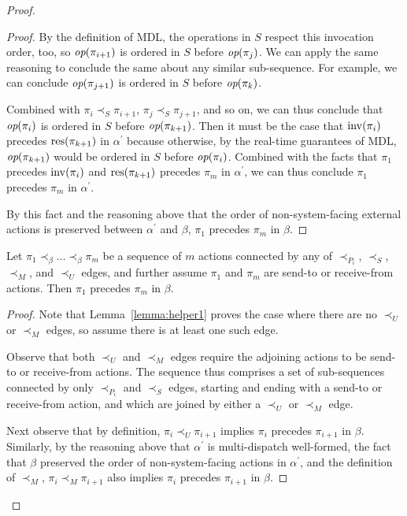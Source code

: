 \begin{proof}
\begin{proof}
      By the definition of MDL, the operations in $S$ respect this invocation order, too, so $\operatorname*{\textit{op}}(\pi_{i+1})$ is ordered in $S$ before $\operatorname*{\textit{op}}(\pi_j)$. We can apply the same reasoning to conclude the same about any similar sub-sequence. For example, we can conclude $\operatorname*{\textit{op}}(\pi_{j+1})$ is ordered in $S$ before $\operatorname*{\textit{op}}(\pi_k)$.

      Combined with $\pi_i \prec_S \pi_{i+1}$, $\pi_j \prec_S \pi_{j+1}$, and so on, we can thus conclude that $\operatorname*{\textit{op}}(\pi_i)$ is ordered in $S$ before $\operatorname*{\textit{op}}(\pi_{k+1})$. Then it must be the case that $\operatorname{inv}(\pi_i)$ precedes $\operatorname{\operatorname{res}}(\pi_{k+1})$ in $\alpha^\prime$ because otherwise, by the real-time guarantees of MDL, $\operatorname*{\textit{op}}(\pi_{k+1})$ would be ordered in $S$ before $\operatorname*{\textit{op}}(\pi_i)$. Combined with the facts that $\pi_1$ precedes $\operatorname{inv}(\pi_i)$ and $\operatorname{\operatorname{res}}(\pi_{k+1})$ precedes $\pi_m$ in $\alpha^\prime$, we can thus conclude $\pi_1$ precedes $\pi_m$ in $\alpha^\prime$.

      By this fact and the reasoning above that the order of non-system-facing external actions is preserved between $\alpha^\prime$ and $\beta$, $\pi_1$ precedes $\pi_m$ in $\beta$.
  \end{proof}

  \begin{lem}
    Let $\pi_1 \prec_\beta \ldots \prec_\beta \pi_m$ be a sequence of $m$ actions connected by any of $\prec_{P_i}$, $\prec_S$, $\prec_M$, and $\prec_U$ edges, and further assume $\pi_1$ and $\pi_m$ are send-to or receive-from actions. Then $\pi_1$ precedes $\pi_m$ in $\beta$.
    \label{lemma:helper2}
  \end{lem}

  \begin{proof}
      Note that Lemma~\ref{lemma:helper1} proves the case where there are no $\prec_U$ or $\prec_M$ edges, so assume there is at least one such edge.

      Observe that both $\prec_U$ and $\prec_M$ edges require the adjoining actions to be send-to or receive-from actions. The sequence thus comprises a set of sub-sequences connected by only $\prec_{P_i}$ and $\prec_S$ edges, starting and ending with a send-to or receive-from action, and which are joined by either a $\prec_U$ or $\prec_M$ edge. 
	
      Next observe that by definition, $\pi_i \prec_U \pi_{i+1}$ implies $\pi_i$ precedes $\pi_{i+1}$ in $\beta$. Similarly, by the reasoning above that $\alpha^\prime$ is multi-dispatch well-formed, the fact that $\beta$ preserved the order of non-system-facing actions in $\alpha^\prime$, and the definition of $\prec_M$, $\pi_i \prec_M \pi_{i+1}$ also implies $\pi_i$ precedes $\pi_{i+1}$ in $\beta$.
	

\end{proof}
\end{proof}
